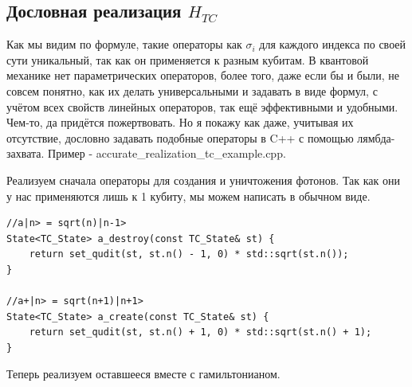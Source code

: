 \documentclass[12pt,fleqn]{article}
\begin{document}
        \subsection{Дословная реализация $H_{TC}$}

        Как мы видим по формуле, такие операторы как $\sigma_{i}$ для каждого индекса по своей сути уникальный, так как он применяется к разным кубитам.
        В квантовой механике нет параметрических операторов, более того, даже если бы и были, не совсем понятно, как их делать универсальными и задавать в виде формул,
        с учётом всех свойств линейных операторов, так ещё эффективными и удобными. Чем-то, да придётся пожертвовать. 
        Но я покажу как даже, учитывая их отсутствие, дословно задавать подобные операторы в C++ с помощью лямбда-захвата. Пример - \textsf{accurate\_realization\_tc\_example.cpp}.

        Реализуем сначала операторы для создания и уничтожения фотонов. Так как они у нас применяются лишь к 1 кубиту, мы можем написать в обычном виде.
\begin{mdframed}[linecolor=black, topline=true, bottomline=true,
leftline=false, rightline=false]
\begin{verbatim}
//a|n> = sqrt(n)|n-1>
State<TC_State> a_destroy(const TC_State& st) {
    return set_qudit(st, st.n() - 1, 0) * std::sqrt(st.n());
}

//a+|n> = sqrt(n+1)|n+1>
State<TC_State> a_create(const TC_State& st) {
    return set_qudit(st, st.n() + 1, 0) * std::sqrt(st.n() + 1);
}
\end{verbatim}
\end{mdframed}

        Теперь реализуем оставшееся вместе с гамильтонианом.
\end{document}
